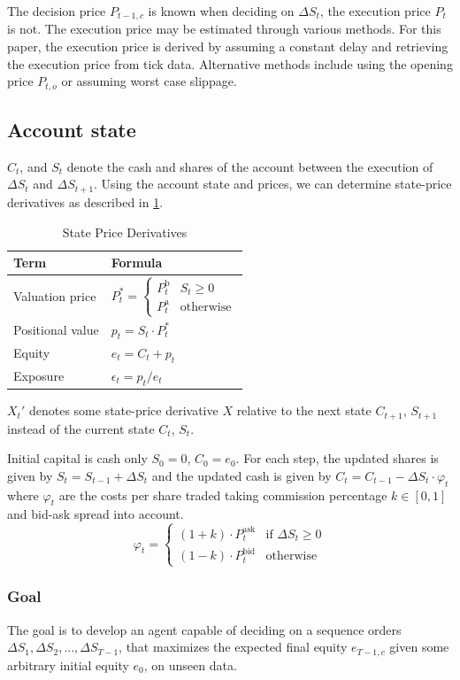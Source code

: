 The decision price $P_{t-1,c}$ is known when deciding on $\Delta S_t$, the execution price $P_t$ is not. The execution price may be estimated through various methods. For this paper, the execution price is derived by assuming a constant delay and retrieving the execution price from tick data. Alternative methods include using the opening price $P_{t,o}$ or assuming worst case slippage. 

\subsection{Account state}

$C_t$, and $S_t$ denote the cash and shares of the account between the execution of $\Delta S_t$ and $\Delta S_{t+1}$. Using the account state and prices, we can determine state-price derivatives as described in \cref{tab:state_price_derivatives}. 

\begin{table}[h!]
    \centering
    \begin{threeparttable}
        \caption{State Price Derivatives}
        \label{tab:state_price_derivatives} 
        \begin{tabular}{ll}
            \toprule
            \textbf{Term} & \textbf{Formula} \\
            \midrule
            Valuation price & $P^*_t =\begin{cases} P^{\text{b}}_t & S_t \ge 0\\ P^{\text{a}}_t & \text{otherwise}\end{cases}$ \\
            Positional value & $p_t = S_t \cdot P^*_t$ \\
            Equity & $e_t = C_t + p_t$ \\
            Exposure & $\epsilon_t = p_t / e_t$ \\
            \bottomrule
        \end{tabular}
        \begin{tablenotes}
            \item $X_t'$ denotes some state-price derivative $X$ relative to the next state $C_{t+1}$, $S_{t+1}$ instead of the current state $C_t$, $S_t$.
        \end{tablenotes}
    \end{threeparttable}
\end{table}

Initial capital is cash only $S_0=0$, $C_0=e_0$. For each step, the updated shares is given by $S_t = S_{t-1} + \Delta S_t$ and the updated cash is given by $C_t = C_{t-1} - \Delta S_t \cdot \varphi_t$ where $\varphi_t$ are the costs per share traded taking commission percentage $k \in[0,1]$ and bid-ask spread into account.
$$
\varphi_t=\begin{cases}
  (1+k)\cdot P_t^\text{ask} & \text{if } \Delta S_t \ge 0 \\
  (1-k)\cdot P_t^\text{bid} & \text{otherwise}
\end{cases}
$$

\subsubsection{Goal} 
\label{sec:goal}
The goal is to develop an agent capable of deciding on a sequence orders $\Delta S_1, \Delta S_2, \dots, \Delta S_{T-1}$, that maximizes the expected final equity $e_{T-1,c}$ given some arbitrary initial equity $e_0$, on unseen data.